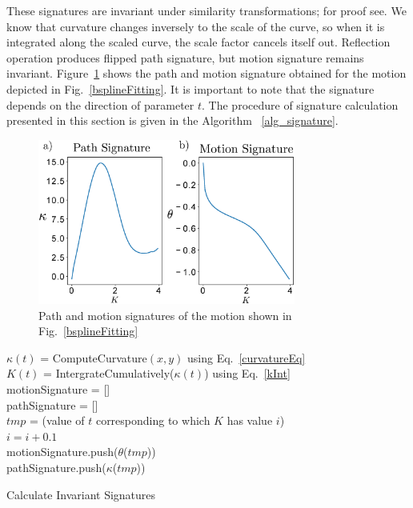 \documentclass[twocolumn,10pt]{asme2ej}
\begin{document}
These signatures are invariant under similarity transformations; for proof see\cite{cui2009}.
We know that curvature changes inversely to the scale of the curve, so when it is integrated along the scaled curve, the scale factor cancels itself out. Reflection operation produces flipped path signature, but motion signature remains invariant.
Figure~\ref{signature} shows the path and motion signature obtained for the motion depicted in Fig.~\ref{bsplineFitting}. It is important to note that the signature depends on the direction of parameter $t$.
The procedure of signature calculation presented in this section is given in the Algorithm ~\ref{alg_signature}.

\begin{figure}
\centering
\includegraphics[width=240pt]{figure/fig_signatures.eps}
  \caption{Path and motion signatures of the motion shown in Fig.~\ref{bsplineFitting}}
\label{signature}
\end{figure}


\begin{algorithm}
    $\kappa(t)$ = ComputeCurvature$(x, y)$ using Eq.~\ref{curvatureEq} \\
    $K(t)$ = IntergrateCumulatively($\kappa(t)$) using Eq.~\ref{kInt} \\
    motionSignature = [] \\
    pathSignature = [] \\
    {
      $tmp$ = (value of $t$ corresponding to which $K$ has value $i$) \\
      $i = i + 0.1$ \\
      motionSignature.push($\theta$($tmp$)) \\
      pathSignature.push($\kappa$($tmp$))
    }
    \caption{Calculate Invariant Signatures}
    \label{alg_signature}
\end{algorithm}
\end{document}
